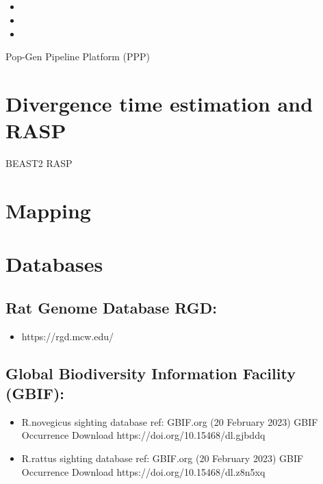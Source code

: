 \documentclass[document.tex]{subfiles}
\begin{document}
        \subsection{ \citetitle{}}
        \begin{itemize}
        \item 
        \item 
        \item 
        \end{itemize} 


        Pop-Gen Pipeline Platform (PPP) 



\section*{Divergence time estimation and RASP}

BEAST2
RASP


\section*{Mapping}


\section*{Databases}

    \subsection{Rat Genome Database RGD: }
    \begin{itemize}
    \item https://rgd.mcw.edu/
    \end{itemize} 

    \subsection{Global Biodiversity Information Facility (GBIF): }
    \begin{itemize}
    \item R.novegicus sighting database ref: GBIF.org (20 February 2023) GBIF Occurrence Download  https://doi.org/10.15468/dl.gjbddq
    \item R.rattus sighting database ref: GBIF.org (20 February 2023) GBIF Occurrence Download https://doi.org/10.15468/dl.z8n5xq
    \end{itemize} 

    

\bib{}
    
\end{document}
